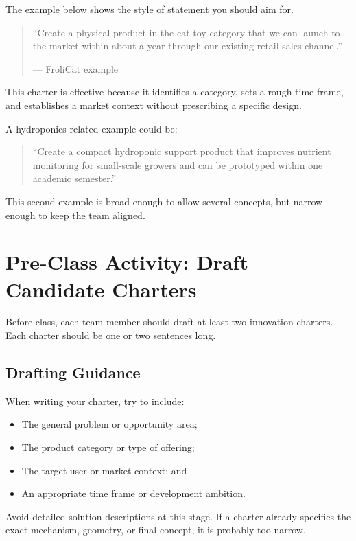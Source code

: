 The example below shows the style of statement you should aim for.

\begin{quote}
``Create a physical product in the cat toy category that we can launch to the market within about a year through our existing retail sales channel.''

\hfill --- FroliCat example
\end{quote}

This charter is effective because it identifies a category, sets a rough time frame, and establishes a market context without prescribing a specific design.

A hydroponics-related example could be:

\begin{quote}
``Create a compact hydroponic support product that improves nutrient monitoring for small-scale growers and can be prototyped within one academic semester.''
\end{quote}

This second example is broad enough to allow several concepts, but narrow enough to keep the team aligned.

\section{Pre-Class Activity: Draft Candidate Charters}

Before class, each team member should draft at least two innovation charters. Each charter should be one or two sentences long.

\subsection{Drafting Guidance}

When writing your charter, try to include:

\begin{itemize}
    \item The general problem or opportunity area;
    \item The product category or type of offering;
    \item The target user or market context; and
    \item An appropriate time frame or development ambition.
\end{itemize}

Avoid detailed solution descriptions at this stage. If a charter already specifies the exact mechanism, geometry, or final concept, it is probably too narrow.


